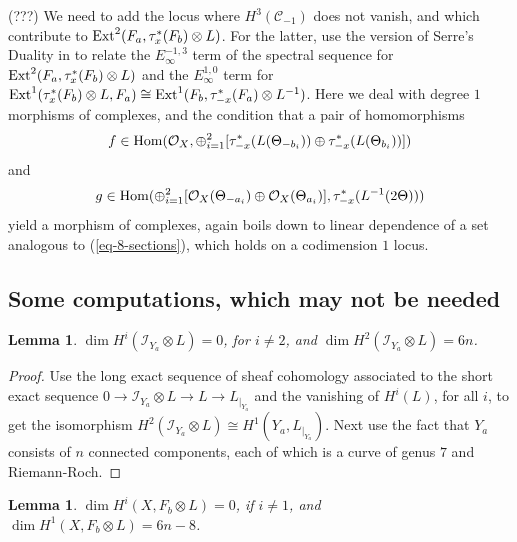 \documentclass[12pt]{amsart}
\numberwithin{equation}{subsection}
\theoremstyle{plain}
\newtheorem{lem}[thm]{Lemma}
\theoremstyle{definition}
\newcommand{\C}{{\mathcal C}}
\newcommand{\StructureSheaf}[1]{{\mathcal O}_{#1}}
\newcommand{\restricted}[2]{#1_{\mid_{#2}}}
\newcommand{\Ext}{{\rm Ext}}
\newcommand{\Hom}{{\rm Hom}}
\newcommand{\Ideal}[1]{{\mathcal I}_{#1}}
\begin{document}
{(???) 
We need to add the locus where $H^3(\C_{-1})$ does not vanish, and which contribute to 
$\Ext^2(F_a,\tau_x^*(F_b)\otimes L)$. For the latter, use the version of Serre's Duality
in \cite[Lemma 4.2]{gulbrandsen} to relate the $E_\infty^{-1,3}$ term of the spectral sequence for $\Ext^2(F_a,\tau_x^*(F_b)\otimes L)$ and  the $E_\infty^{1,0}$ term for $\Ext^1(\tau_x^*(F_b)\otimes L,F_a)\cong
\Ext^1(F_b,\tau_{-x}^*(F_a)\otimes L^{-1})$. Here we deal with degree $1$ morphisms of complexes, and the condition that a pair of homomorphisms 
\[
f\in \Hom(\StructureSheaf{X},\oplus_{i=1}^2[\tau_{-x}^*(L(\Theta_{-b_i}))\oplus \tau_{-x}^*(L(\Theta_{b_i}))])
\]
and 
\[
g\in \Hom(\oplus_{i=1}^2[\StructureSheaf{X}(\Theta_{-a_i})\oplus \StructureSheaf{X}(\Theta_{a_i})],\tau_{-x}^*(L^{-1}(2\Theta)))
\]
 yield a morphism of complexes, again boils down to linear dependence of a set analogous to 
 (\ref{eq-8-sections}), which holds on a codimension $1$ locus.

% 
\subsection{Some computations, which may not be needed}

\begin{lem}
\label{lemma-cohomologies-of-ideal-sheaf}
$\dim H^i(\Ideal{Y_a}\otimes L)=0$, for $i\neq 2$, and $\dim H^2(\Ideal{Y_a}\otimes L)=6n$.
\end{lem}

\begin{proof}
Use the long exact sequence of sheaf cohomology associated to the short exact sequence
$0\rightarrow\Ideal{Y_a}\otimes L \rightarrow L \rightarrow \restricted{L}{Y_a}$ and the vanishing of $H^i(L)$, for all $i$, to get the isomorphism
$H^2(\Ideal{Y_a}\otimes L)\cong H^1(Y_a,\restricted{L}{Y_a})$. Next use the fact that $Y_a$ consists of $n$ connected components, each of which is a curve of genus $7$ and Riemann-Roch.
\end{proof}

\begin{lem}
$\dim H^i(X,F_b\otimes L)=0$, if $i\neq 1$, and $\dim H^1(X,F_b\otimes L)=6n-8$.
\end{lem}

}
\end{document}
